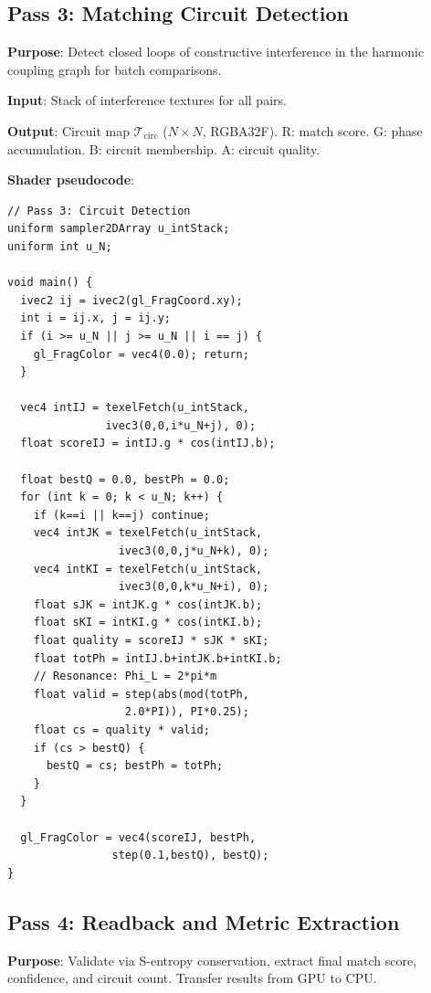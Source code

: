 \documentclass[11pt,twocolumn,a4paper]{article}
\begin{document}
\subsection{Pass 3: Matching Circuit Detection}
\label{subsec:pass3}

\textbf{Purpose}: Detect closed loops of constructive interference in
the harmonic coupling graph for batch comparisons.

\textbf{Input}: Stack of interference textures for all pairs.

\textbf{Output}: Circuit map $\mathcal{T}_{\text{circ}}$ ($N \times N$,
RGBA32F). R: match score. G: phase accumulation. B: circuit membership.
A: circuit quality.

\textbf{Shader pseudocode}:
\begin{lstlisting}[style=glsl]
// Pass 3: Circuit Detection
uniform sampler2DArray u_intStack;
uniform int u_N;

void main() {
  ivec2 ij = ivec2(gl_FragCoord.xy);
  int i = ij.x, j = ij.y;
  if (i >= u_N || j >= u_N || i == j) {
    gl_FragColor = vec4(0.0); return;
  }

  vec4 intIJ = texelFetch(u_intStack,
               ivec3(0,0,i*u_N+j), 0);
  float scoreIJ = intIJ.g * cos(intIJ.b);

  float bestQ = 0.0, bestPh = 0.0;
  for (int k = 0; k < u_N; k++) {
    if (k==i || k==j) continue;
    vec4 intJK = texelFetch(u_intStack,
                 ivec3(0,0,j*u_N+k), 0);
    vec4 intKI = texelFetch(u_intStack,
                 ivec3(0,0,k*u_N+i), 0);
    float sJK = intJK.g * cos(intJK.b);
    float sKI = intKI.g * cos(intKI.b);
    float quality = scoreIJ * sJK * sKI;
    float totPh = intIJ.b+intJK.b+intKI.b;
    // Resonance: Phi_L = 2*pi*m
    float valid = step(abs(mod(totPh,
                  2.0*PI)), PI*0.25);
    float cs = quality * valid;
    if (cs > bestQ) {
      bestQ = cs; bestPh = totPh;
    }
  }

  gl_FragColor = vec4(scoreIJ, bestPh,
                step(0.1,bestQ), bestQ);
}
\end{lstlisting}

\subsection{Pass 4: Readback and Metric Extraction}
\label{subsec:pass4}

\textbf{Purpose}: Validate via S-entropy conservation, extract final
match score, confidence, and circuit count. Transfer results from GPU
to CPU.
\end{document}
